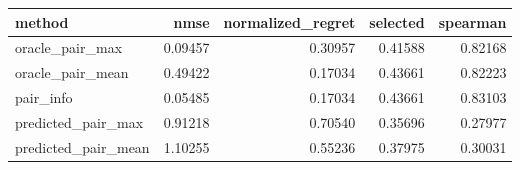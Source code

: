 \begin{tabular}{lrrrr}
\toprule
method & nmse & normalized_regret & selected & spearman \\
\midrule
oracle_pair_max & 0.09457 & 0.30957 & 0.41588 & 0.82168 \\
oracle_pair_mean & 0.49422 & 0.17034 & 0.43661 & 0.82223 \\
pair_info & 0.05485 & 0.17034 & 0.43661 & 0.83103 \\
predicted_pair_max & 0.91218 & 0.70540 & 0.35696 & 0.27977 \\
predicted_pair_mean & 1.10255 & 0.55236 & 0.37975 & 0.30031 \\
\bottomrule
\end{tabular}
